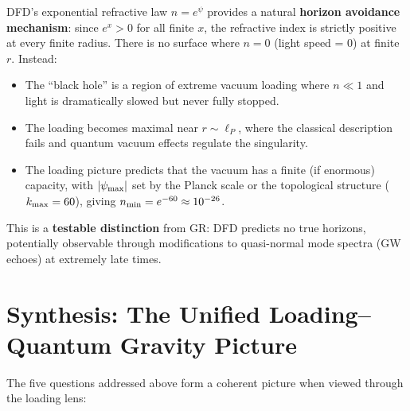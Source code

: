 \documentclass[11pt,a4paper]{article}
\begin{document}
\begin{tcolorbox}[colback=yellow!5, colframe=orange!50!black,
title=Black Holes in the Loading Picture]
DFD's exponential refractive law $n = e^\psi$ provides a natural
\textbf{horizon avoidance mechanism}: since $e^x > 0$ for all finite $x$,
the refractive index is strictly positive at every finite radius.  There is
no surface where $n = 0$ (light speed = 0) at finite $r$.  Instead:
\begin{itemize}
\item The ``black hole'' is a region of extreme vacuum loading where
$n \ll 1$ and light is dramatically slowed but never fully stopped.
\item The loading becomes maximal near $r \sim \ell_P$, where the
classical description fails and quantum vacuum effects regulate the
singularity.
\item The loading picture predicts that the vacuum has a finite
(if enormous) capacity, with $|\psi_{\rm max}|$ set by the Planck scale
or the topological structure ($k_{\rm max} = 60$), giving
$n_{\rm min} = e^{-60} \approx 10^{-26}$.
\end{itemize}
This is a \textbf{testable distinction} from GR: DFD predicts no true
horizons, potentially observable through modifications to quasi-normal mode
spectra (GW echoes) at extremely late times.
\end{tcolorbox}


\section{Synthesis: The Unified Loading--Quantum Gravity Picture}
\label{sec:synthesis}

The five questions addressed above form a coherent picture when viewed
through the loading lens:
\end{document}

